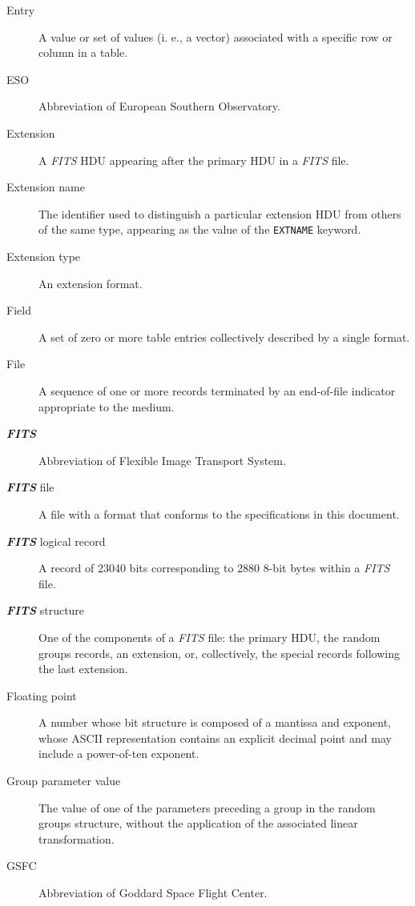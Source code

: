 \begin{description}
\item[Entry] A value or set of values (i. e., a vector)
       associated with a specific row or column in a table.
\item[ESO] Abbreviation of European Southern Observatory.
\item[Extension] A {\em FITS\/} HDU 
     appearing after the primary HDU in a 
     {\em FITS\/} file.
\item[Extension name] The identifier used to distinguish a particular 
     extension HDU from others of the same type, appearing as the value
     of the {\tt EXTNAME} 
     keyword.
\item[Extension type] An extension format.
\item[Field] A set of zero or more table entries collectively described by a
             single format.
\item[File] A sequence of one or more records terminated by an end-of-file
             indicator appropriate to the medium.
\item[{\em\bf FITS}] Abbreviation of Flexible Image Transport System.
\item[{\em\bf FITS} file] A file with a format that conforms to the 
            specifications in this document.
\item[{\em\bf FITS} logical record] A record of 23040 bits 
            corresponding to 2880 8-bit bytes within a {\em FITS\/} file.
\item[{\em\bf FITS} structure] One of the 
               components of a {\em FITS\/} file: 
               the primary HDU, 
               the random groups records, an 
               extension, or, collectively, 
               the special records following 
               the last extension.
\item[Floating point] A number whose bit structure is composed of a 
            mantissa and exponent, whose ASCII representation contains 
            an explicit decimal
            point and may include a power-of-ten exponent.
\item[Group parameter value] The 
     value of one of the parameters preceding a group in the random groups
     structure, without the application of the 
     associated linear transformation.
\item[GSFC] Abbreviation of Goddard Space Flight Center.

\end{description}
